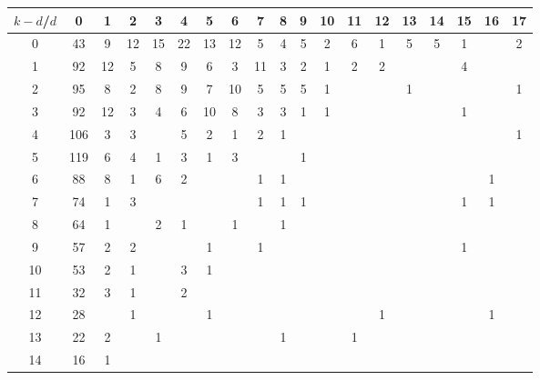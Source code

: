 \documentclass{article}
\begin{document}
\begin{table}[h]\footnotesize
{\centering
\begin{tabular}{|c|c|
c|c|c|c|c|c|c|c|c|c|c|c|c|c|c|c|c|}
  \hline
  $k-d$/$d$ 
 & 0 & 1 & 2 & 3 & 4 & 5 & 6 & 7 & 8 & 9 & 10 & 11 & 12 & 13 & 14 & 15 & 16 & 17\\

  \hline
  \hline

0  & 43 & 9 & 12 & 15 & 22 & 13 & 12 & 5 & 4 & 5 & 2 & 6 & 1 & 5 & 5 & 1 &  & 2\\

1  & 92 & 12 & 5 & 8 & 9 & 6 & 3 & 11 & 3 & 2 & 1 & 2 & 2 &  &  & 4 &  & \\

2  & 95 & 8 & 2 & 8 & 9 & 7 & 10 & 5 & 5 & 5 & 1 &  &  & 1 &  &  &  & 1\\

3  & 92 & 12 & 3 & 4 & 6 & 10 & 8 & 3 & 3 & 1 & 1 &  &  &  &  & 1 &  & \\

4  & 106 & 3 & 3 &  & 5 & 2 & 1 & 2 & 1 &  &  &  &  &  &  &  &  & 1\\

5  & 119 & 6 & 4 & 1 & 3 & 1 & 3 &  &  & 1 &  &  &  &  &  &  &  & \\

6  & 88 & 8 & 1 & 6 & 2 &  &  & 1 & 1 &  &  &  &  &  &  &  & 1 & \\

7  & 74 & 1 & 3 &  &  &  &  & 1 & 1 & 1 &  &  &  &  &  & 1 & 1 & \\

8  & 64 & 1 &  & 2 & 1 &  & 1 &  & 1 &  &  &  &  &  &  &  &  & \\

9  & 57 & 2 & 2 &  &  & 1 &  & 1 &  &  &  &  &  &  &  & 1 &  & \\

10  & 53 & 2 & 1 &  & 3 & 1 &  &  &  &  &  &  &  &  &  &  &  & \\

11  & 32 & 3 & 1 &  & 2 &  &  &  &  &  &  &  &  &  &  &  &  & \\

12  & 28 &  & 1 &  &  & 1 &  &  &  &  &  &  & 1 &  &  &  & 1 & \\

13  & 22 & 2 &  & 1 &  &  &  &  & 1 &  &  & 1 &  &  &  &  &  & \\

14  & 16 & 1 &  &  &  &  &  &  &  &  &  &  &  &  &  &  &  & \\


\end{tabular}}
\end{table}
\end{document}
